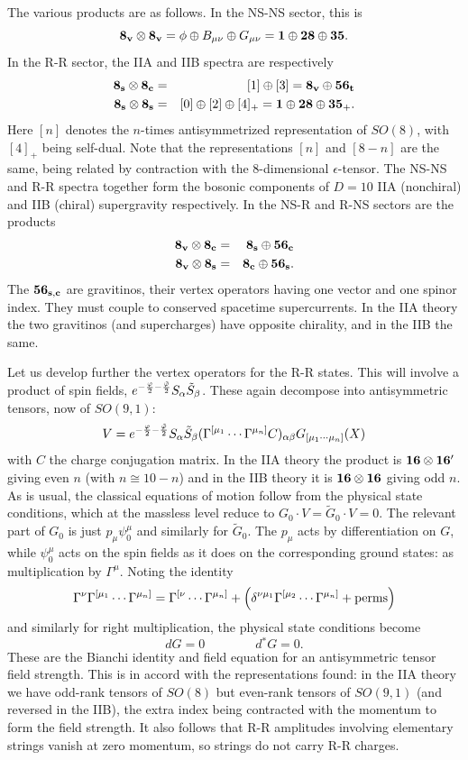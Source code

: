 \documentclass[12pt]{article}
\def\be{\begin{equation}}
\def\ee{\end{equation}}
\def\bea{\begin{eqnarray}}
\def\eea{\end{eqnarray}}
\begin{document}
The various products are as follows.  In the NS-NS sector,
this is
\be
{\bf 8_v} \otimes {\bf 8_v} = \phi \oplus B_{\mu\nu} \oplus G_{\mu\nu}
={\bf 1} \oplus {\bf 28}  \oplus {\bf 35} .
\ee
In the R-R sector, the IIA and IIB spectra are respectively
\bea
{\bf 8_s} \otimes {\bf 8_c} &=& [1] \oplus [3] = {\bf 8_v} \oplus
{\bf 56_t} \nonumber\\
{\bf 8_s} \otimes {\bf 8_s} &=& [0] \oplus [2] \oplus [4]_+
= {\bf 1} \oplus {\bf 28}  \oplus {\bf 35}_+ .
\eea
Here $[n]$ denotes the $n$-times antisymmetrized representation of
$SO(8)$, with $[4]_+$ being self-dual.  Note that the representations
$[n]$ and $[8-n]$ are the same, being related by contraction with the
8-dimensional $\epsilon$-tensor.
The NS-NS and R-R spectra
together form the bosonic components of $D=10$ IIA (nonchiral) and IIB
(chiral) supergravity respectively.  In the NS-R and R-NS sectors are
the products
\bea
{\bf 8_v} \otimes {\bf 8_c} &=& 
{\bf 8_s}\oplus{\bf 56_c} \nonumber\\
{\bf 8_v} \otimes {\bf 8_s} &=&
{\bf 8_c}\oplus{\bf 56_s}.
\eea
The $\bf 56_{s,c}$ are gravitinos, their vertex operators having one
vector and one spinor index.  They must couple to conserved spacetime
supercurrents.  In the IIA theory the two gravitinos (and
supercharges) have opposite chirality, and in the IIB the same.

Let us develop further the vertex operators for the R-R states.  
This will involve a product of spin fields, \cite{fms}
$e^{-{{\varphi}\over{2}} - {{\tilde{\varphi}}\over{2}} } S_{\alpha}
\tilde{S}_{\beta}$.  These again decompose into antisymmetric tensors, now
of $SO(9,1)$: 
\be
V = e^{ -{{\varphi}\over{2}} - {{\tilde{\varphi}}\over{2}} } S_{\alpha} 
\tilde{S}_{\beta}
( \Gamma^{[\mu_1} \cdots \Gamma^{\mu_n]}C)_{\alpha\beta} G_{[\mu_1 \cdots
\mu_n]}(X) \label{rrver}
\ee
with $C$ the charge conjugation matrix.  In the IIA theory the
product is ${\bf 16} \otimes {\bf 16'}$ giving even $n$ (with $n \cong
10-n$) and in the IIB theory it is ${\bf 16} \otimes {\bf 16}$ giving odd
$n$.
As is usual, the classical equations of motion follow from the 
physical state conditions, which at the massless level reduce to
$G_0 \cdot V = \tilde{G}_0 \cdot V = 0.$
The relevant part of $G_0$ is just $p_\mu \psi^\mu_0$ and similarly for
$\tilde G_0$.  The $p_\mu$ acts by differentiation on $G$, while
$\psi_0^\mu$ acts on the spin fields as it does on the corresponding
ground states: as multiplication by $\Gamma^\mu$.  Noting the identity
\be
\Gamma^\nu \Gamma^{[\mu_1} \cdots \Gamma^{\mu_n]} =
\Gamma^{[\nu} \cdots \Gamma^{\mu_n]} +
\left( \delta^{\nu\mu_1} \Gamma^{[\mu_2} \cdots \Gamma^{\mu_n]}
+ {\rm perms} \right)  \label{gamma}
\ee
and similarly for right multiplication, the physical state conditions
become
\be
dG=0 \qquad\qquad d{}^* G = 0.
\ee
These are the Bianchi identity and field equation for an antisymmetric
tensor field strength.  This is in accord with the representations found:
in the IIA theory we have odd-rank tensors of $SO(8)$ but even-rank
tensors of $SO(9,1)$ (and reversed in the IIB), the extra index being
contracted with the momentum to form the field strength.
It also follows that R-R amplitudes involving elementary strings vanish
at zero momentum, so strings do not carry R-R charges.
\end{document}
